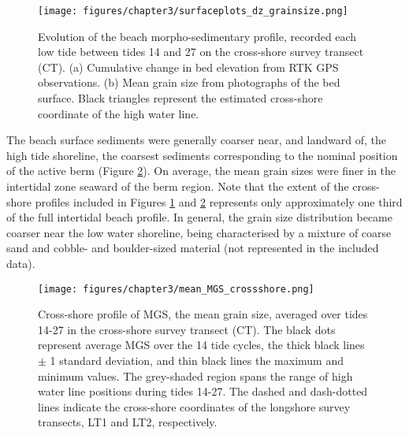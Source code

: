 \documentclass[jmse,article,submit,pdftex,moreauthors]{Definitions/mdpi}
\begin{document}
\begin{figure}[tbp] %
	\texttt{[image: figures/chapter3/surfaceplots\_dz\_grainsize.png]}
	\caption[Surface plots of bed level change and mean grain size by tide]{Evolution of the beach morpho-sedimentary profile, recorded each low tide between tides 14 and 27 on the cross-shore survey transect (CT). (a) Cumulative change in bed elevation from RTK GPS observations. (b) Mean grain size from photographs of the bed surface. Black triangles represent the estimated cross-shore coordinate of the high water line.}
	\label{fig:alltides_profiles}
\end{figure}

The beach surface sediments were generally coarser near, and landward of, the high tide shoreline, the coarsest sediments corresponding to the nominal position of the active berm (Figure \ref{fig:mean_MGS_profile}). On average, the mean grain sizes were finer in the intertidal zone seaward of the berm region. Note that the extent of the cross-shore profiles included in Figures \ref{fig:alltides_profiles} and \ref{fig:mean_MGS_profile} represents only approximately one third of the full intertidal beach profile. In general, the grain size distribution became coarser near the low water shoreline, being characterised by a mixture of coarse sand and cobble- and boulder-sized material (not represented in the included data). 

\begin{figure}[tbp] %
	\begin{center}
		\texttt{[image: figures/chapter3/mean\_MGS\_crossshore.png]}
		\caption[Cross-shore profile of mean grain size]{Cross-shore profile of MGS, the mean grain size, averaged over tides 14-27 in the cross-shore survey transect (CT). The black dots represent average MGS over the 14 tide cycles, the thick black lines $\pm$ 1 standard deviation, and thin black lines the maximum and minimum values. The grey-shaded region spans the range of high water line positions during tides 14-27. The dashed and dash-dotted lines indicate the cross-shore coordinates of the longshore survey transects, LT1 and LT2, respectively. \label{fig:mean_MGS_profile}}
	\end{center}
\end{figure}
\end{document}
